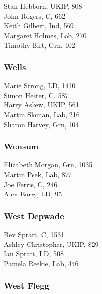 \documentclass[a4paper,openany,10pt]{book}
\begin{document}


Stan Hebborn, UKIP, 808\\
John Rogers, C, 662\\
Keith Gilbert, Ind, 569\\
Margaret Holmes, Lab, 270\\
Timothy Birt, Grn, 102\\


\subsubsection*{Wells}



Marie Strong, LD, 1410\\
Simon Hester, C, 587\\
Harry Askew, UKIP, 561\\
Martin Sloman, Lab, 216\\
Sharon Harvey, Grn, 104\\


\subsubsection*{Wensum}



Elizabeth Morgan, Grn, 1035\\
Martin Peek, Lab, 877\\
Joe Ferris, C, 246\\
Alex Barry, LD, 95\\


\subsubsection*{West Depwade}



Bev Spratt, C, 1531\\
Ashley Christopher, UKIP, 829\\
Ian Spratt, LD, 508\\
Pamela Reekie, Lab, 446\\


\subsubsection*{West Flegg}
\end{document}
